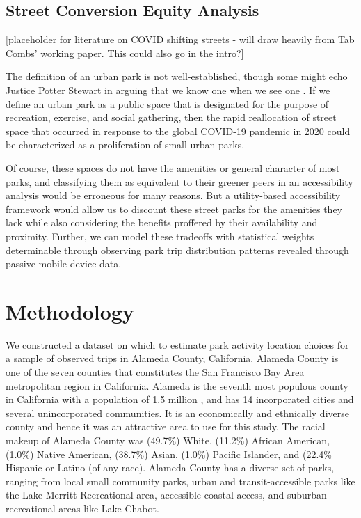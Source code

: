 \documentclass[3p, authoryear, review]{elsarticle} %
\begin{document}
\hypertarget{street-conversion-equity-analysis}{%
\subsection{Street Conversion Equity Analysis}\label{street-conversion-equity-analysis}}

{[}placeholder for literature on COVID shifting streets - will draw heavily from
Tab Combs' working paper. This could also go in the intro?{]}

The definition of an urban park is not well-established, though some might echo
Justice Potter Stewart in arguing that we know one when we see one
\citep{1964jacobellis}. If we define an urban park as a public space that is
designated for the purpose of recreation, exercise, and social gathering, then
the rapid reallocation of street space that occurred in response to the global
COVID-19 pandemic in 2020 could be characterized as a proliferation of
small urban parks.

Of course, these spaces do not have the amenities or general character of most
parks, and classifying them as equivalent to their greener peers in an
accessibility analysis would be erroneous for many reasons. But a utility-based
accessibility framework would allow us to discount these street parks for the
amenities they lack while also considering the benefits proffered by their
availability and proximity. Further, we can model these tradeoffs with
statistical weights determinable through observing park trip distribution
patterns revealed through passive mobile device data.

\hypertarget{methodology}{%
\section{Methodology}\label{methodology}}

We constructed a dataset on which to estimate park activity location choices for
a sample of observed trips in Alameda County, California. Alameda County is one
of the seven counties that constitutes the San Francisco Bay Area metropolitan
region in California. Alameda is the seventh most populous county in California
with a population of 1.5 million \citep{alamedafacts}, and has 14 incorporated cities
and several unincorporated communities. It is an economically and ethnically
diverse county and hence it was an attractive area to use for this study. The
racial makeup of Alameda County was (49.7\%) White, (11.2\%) African American,
(1.0\%) Native American, (38.7\%) Asian, (1.0\%) Pacific Islander, and (22.4\%
Hispanic or Latino (of any race). Alameda County has a diverse set of parks,
ranging from local small community parks, urban and transit-accessible parks
like the Lake Merritt Recreational area, accessible coastal access, and suburban
recreational areas like Lake Chabot.
\end{document}
